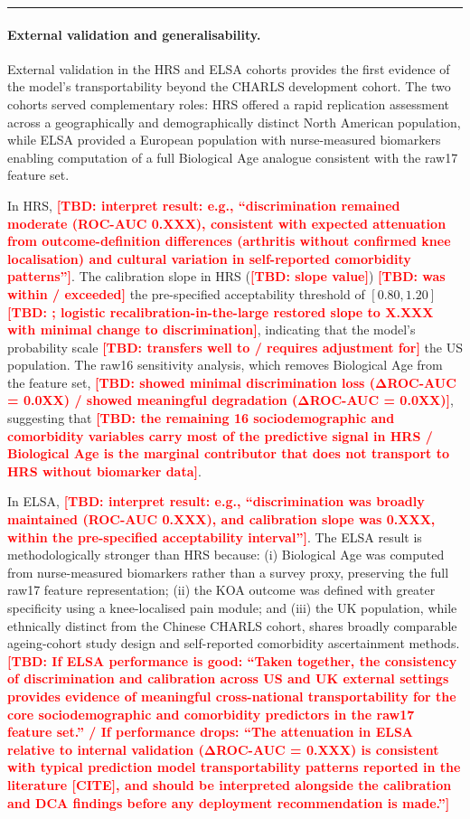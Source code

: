 \documentclass[11pt,a4paper]{article}
\newcommand{\TBD}[1]{\textcolor{red}{\textbf{[TBD: #1]}}}
\begin{document}
\vspace{4pt}
\hrule
\vspace{8pt}

\paragraph{External validation and generalisability.}
External validation in the HRS and ELSA cohorts provides the first evidence of the model's transportability beyond the CHARLS development cohort. The two cohorts served complementary roles: HRS offered a rapid replication assessment across a geographically and demographically distinct North American population, while ELSA provided a European population with nurse-measured biomarkers enabling computation of a full Biological Age analogue consistent with the raw17 feature set.

In HRS, \TBD{interpret result: e.g., ``discrimination remained moderate (ROC-AUC 0.XXX), consistent with expected attenuation from outcome-definition differences (arthritis without confirmed knee localisation) and cultural variation in self-reported comorbidity patterns''}. The calibration slope in HRS (\TBD{slope value}) \TBD{was within / exceeded} the pre-specified acceptability threshold of $[0.80, 1.20]$\TBD{; logistic recalibration-in-the-large restored slope to X.XXX with minimal change to discrimination}, indicating that the model's probability scale \TBD{transfers well to / requires adjustment for} the US population. The raw16 sensitivity analysis, which removes Biological Age from the feature set, \TBD{showed minimal discrimination loss (ΔROC-AUC = 0.0XX) / showed meaningful degradation (ΔROC-AUC = 0.0XX)}, suggesting that \TBD{the remaining 16 sociodemographic and comorbidity variables carry most of the predictive signal in HRS / Biological Age is the marginal contributor that does not transport to HRS without biomarker data}.

In ELSA, \TBD{interpret result: e.g., ``discrimination was broadly maintained (ROC-AUC 0.XXX), and calibration slope was 0.XXX, within the pre-specified acceptability interval''}. The ELSA result is methodologically stronger than HRS because: (i) Biological Age was computed from nurse-measured biomarkers rather than a survey proxy, preserving the full raw17 feature representation; (ii) the KOA outcome was defined with greater specificity using a knee-localised pain module; and (iii) the UK population, while ethnically distinct from the Chinese CHARLS cohort, shares broadly comparable ageing-cohort study design and self-reported comorbidity ascertainment methods. \TBD{If ELSA performance is good: ``Taken together, the consistency of discrimination and calibration across US and UK external settings provides evidence of meaningful cross-national transportability for the core sociodemographic and comorbidity predictors in the raw17 feature set.'' / If performance drops: ``The attenuation in ELSA relative to internal validation (ΔROC-AUC = 0.XXX) is consistent with typical prediction model transportability patterns reported in the literature [CITE], and should be interpreted alongside the calibration and DCA findings before any deployment recommendation is made.''}
\end{document}

